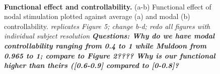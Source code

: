 \begin{figure}
\\
 \caption{\textbf{Functional effect and controllability.} (a-b) Functional effect of nodal stimulation plotted against average (a) and modal (b) controllability.
 \textit{replicates Figure 5; change b-d; redo all figures with individual subject resolution }\textbf{\textit{Questions: Why do we have modal controllability 
 ranging from 0.4 to 1 while Muldoon from 0.965 to 1; compare to Figure 2???? Why is our functional higher than theirs ([0.6-0.9] compared to [0-0.8]?}}} 
 \label{fig:controllability-functional-effect}
\end{figure}



